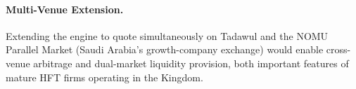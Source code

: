 \documentclass[12pt]{article}
\begin{document}
\paragraph{Multi-Venue Extension.}
Extending the engine to quote simultaneously on Tadawul and the NOMU
Parallel Market (Saudi Arabia's growth-company exchange) would enable
cross-venue arbitrage and dual-market liquidity provision, both
important features of mature HFT firms operating in the Kingdom.

\newpage

\printbibliography[heading=bibintoc, title={References}]
\end{document}
